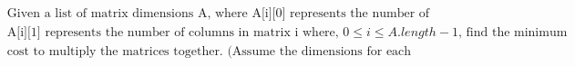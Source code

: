 \documentclass[preview]{standalone}
\begin{document}
\begin{center}
\begin{align*}&\text{Given a list of matrix dimensions A, where A[i][0] represents 
                                  the number of rows in matrix i and}\\&\text{A[i][1] represents the number of columns in matrix i where, } 
                                  0 \leq i \leq A.length - 1 \text{, find the minimum}\\&\text{cost to multiply the matrices together. 
                                  (Assume the dimensions for each matrix in A are valid for multiplication)}\end{align*}
\end{center}
\end{document}
